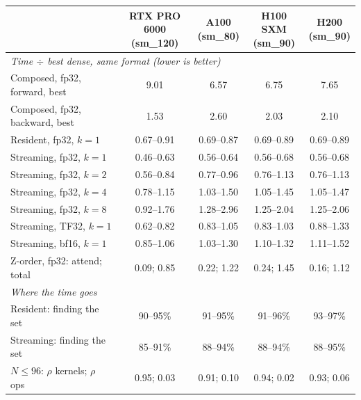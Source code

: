 \begin{tabular}{lcccc}
\toprule
& \shortstack{RTX PRO 6000\\(sm\_120)} & \shortstack{A100\\(sm\_80)} & \shortstack{H100 SXM\\(sm\_90)} & \shortstack{H200\\(sm\_90)} \\
\midrule
\multicolumn{5}{l}{\emph{Time $\div$ best dense, same format (lower is better)}} \\
Composed, fp32, forward, best & 9.01 & 6.57 & 6.75 & 7.65 \\
Composed, fp32, backward, best & 1.53 & 2.60 & 2.03 & 2.10 \\
Resident, fp32, $k{=}1$ & 0.67--0.91 & 0.69--0.87 & 0.69--0.89 & 0.69--0.89 \\
Streaming, fp32, $k{=}1$ & 0.46--0.63 & 0.56--0.64 & 0.56--0.68 & 0.56--0.68 \\
Streaming, fp32, $k{=}2$ & 0.56--0.84 & 0.77--0.96 & 0.76--1.13 & 0.76--1.13 \\
Streaming, fp32, $k{=}4$ & 0.78--1.15 & 1.03--1.50 & 1.05--1.45 & 1.05--1.47 \\
Streaming, fp32, $k{=}8$ & 0.92--1.76 & 1.28--2.96 & 1.25--2.04 & 1.25--2.06 \\
Streaming, TF32, $k{=}1$ & 0.62--0.82 & 0.83--1.05 & 0.83--1.03 & 0.88--1.33 \\
Streaming, bf16, $k{=}1$ & 0.85--1.06 & 1.03--1.30 & 1.10--1.32 & 1.11--1.52 \\
Z-order, fp32: attend; total & 0.09; 0.85 & 0.22; 1.22 & 0.24; 1.45 & 0.16; 1.12 \\
\midrule \multicolumn{5}{l}{\emph{Where the time goes}} \\
Resident: finding the set & 90--95\% & 91--95\% & 91--96\% & 93--97\% \\
Streaming: finding the set & 85--91\% & 88--94\% & 88--94\% & 88--95\% \\
$N{\le}96$: $\rho$ kernels; $\rho$ ops & 0.95; 0.03 & 0.91; 0.10 & 0.94; 0.02 & 0.93; 0.06 \\
\bottomrule
\end{tabular}%
